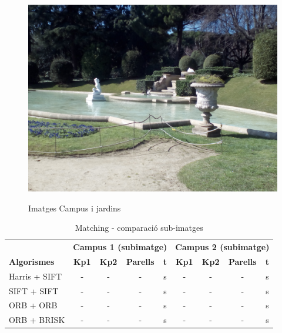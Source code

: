 \begin{figure}[!htb]
				\label{fig:awesome_image3}
			\endminipage\hfill
				\includegraphics[width=\linewidth]{images/experiments/jardi2}
				\label{fig:awesome_image3}
			\endminipage
			\caption{Imatges Campus i jardins}
		\end{figure}

		\begin{table}[H]
			\begin{center}
				\begin{tabular}{l | c c c c | c c c c}
					& \multicolumn{4}{c|}{\textbf{Campus 1 (subimatge)}} & \multicolumn{4}{c}{\textbf{Campus 2 (subimatge)}} \\
					\textbf{Algorismes} & \textbf{Kp1} & \textbf{Kp2} & \textbf{Parells} & \textbf{t} & \textbf{Kp1} & \textbf{Kp2} & \textbf{Parells} & \textbf{t} \\ \hline
					Harris + SIFT & - & - & - & s & - & - & - & s \\
					SIFT + SIFT & - & - & - & s & - & - & - & s \\
					ORB + ORB & - & - & - & s & - & - & - & s \\
					ORB + BRISK & - & - & - & s & - & - & - & s \\
				\end{tabular}
			\end{center}
			\caption{Matching - comparació sub-imatges}
		\end{table}


